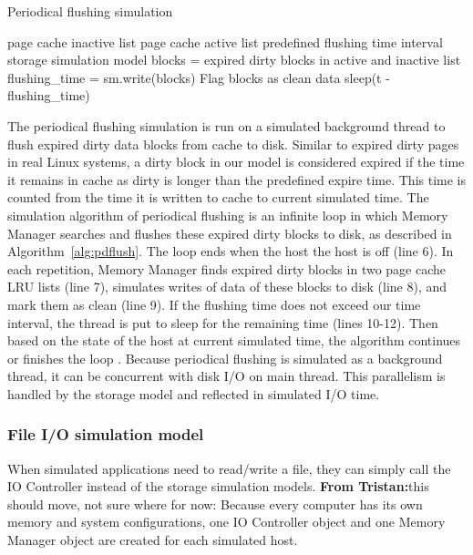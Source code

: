 \documentclass[conference]{IEEEtran}
\newcommand{\Desc}[2]{\State \makebox[2em][l]{#1}#2}
\newcommand{\tristan}[1]{\color{orange}\textbf{From Tristan:}#1\color{black}}
\begin{document}
			\begin{algorithm}\caption{Periodical flushing simulation}\label{alg:pdflush}
				\small
				\begin{algorithmic}[1]
					\Input
        				\Desc{in}{page cache inactive list}
        				\Desc{ac}{page cache active list}
						\Desc{t}{predefined flushing time interval}
						\Desc{sm}{storage simulation model}
   					\EndInput
						\State blocks = expired dirty blocks in active and inactive list
						\State flushing\_time = sm.write(blocks)
						\State Flag blocks as clean data
							\State sleep(t - flushing\_time)
						\EndIf
					\EndWhile
				\end{algorithmic}
			\end{algorithm}				
			
			The periodical flushing simulation is run on a simulated background thread 
			to flush expired dirty data blocks from cache to disk.
			Similar to expired dirty pages in real Linux systems, a dirty block in our model 
			is considered expired if the time it remains in cache as dirty is longer than 
			the predefined expire time. This time is counted from the time it is written 
			to cache to current simulated time. 
			The simulation algorithm of periodical flushing is an infinite loop in which 
			Memory Manager searches and flushes these expired dirty blocks to disk, 
			as described in Algorithm~\ref{alg:pdflush}. 
			The loop ends when the host the host is off (line 6). 
			In each repetition, Memory Manager finds expired dirty blocks in two 
			page cache LRU lists (line 7), simulates writes of data of these blocks 
			to disk (line 8), and mark them as clean (line 9).
			If the flushing time does not exceed our time interval, the thread is put 
			to sleep for the remaining time (lines 10-12). 
			Then based on the state of the host at current simulated time, 
			the algorithm continues or finishes the loop .
			Because periodical flushing is simulated as a background thread, it can be 
			concurrent with disk I/O on main thread. This parallelism is handled by the 
			storage model and reflected in simulated I/O time. 	

			\subsubsection{File I/O simulation model}			
			 
			When simulated applications need to read/write a file, they can simply call 
			the IO Controller instead of the storage simulation models. 
			\tristan{this should move, not sure where for now: 
			Because every computer has its own memory and system configurations, 
			one IO Controller object and one Memory Manager object are created 
			for each simulated host.}
			
\end{document}
